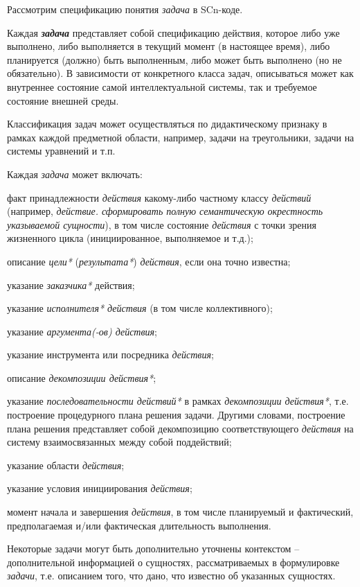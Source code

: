 Рассмотрим спецификацию понятия \textit{задача} в SCn-коде.

\begin{SCn}
\end{SCn}

Каждая \textbf{\textit{задача}} представляет собой спецификацию действия, которое либо уже выполнено, либо выполняется в текущий момент (в настоящее время), либо планируется (должно) быть выполненным, либо может быть выполнено (но не обязательно). В зависимости от конкретного класса задач, описываться может как внутреннее состояние самой интеллектуальной системы, так и требуемое состояние внешней среды.

Классификация задач может осуществляться по дидактическому признаку в рамках каждой предметной области, например, задачи на треугольники, задачи на системы уравнений и т.п.

Каждая \textit{задача} может включать:
\begin{textitemize}
	\item факт принадлежности \textit{действия} какому-либо частному классу \textit{действий} (например,\textit{ действие. сформировать полную семантическую окрестность указываемой сущности}), в том числе состояние \textit{действия} с точки зрения жизненного цикла (инициированное, выполняемое и т.д.);
	\item описание \textit{цели*} (\textit{результата*}) \textit{действия}, если она точно известна;
	\item указание \textit{заказчика*} действия;
	\item указание \textit{исполнителя* действия} (в том числе коллективного);
	\item указание \textit{аргумента(-ов) действия\scnrolesign};
	\item указание инструмента или посредника \textit{действия};
	\item описание \textit{декомпозиции действия*};
	\item указание \textit{последовательности действий*} в рамках \textit{декомпозиции действия*}, т.е. построение процедурного плана решения задачи. Другими словами, построение плана решения представляет собой декомпозицию соответствующего \textit{действия} на систему взаимосвязанных между собой поддействий;
	\item указание области \textit{действия};
	\item указание условия инициирования \textit{действия};
	\item момент начала и завершения \textit{действия}, в том числе планируемый и фактический, предполагаемая и/или фактическая длительность выполнения.
\end{textitemize}
Некоторые задачи могут быть дополнительно уточнены контекстом -- дополнительной информацией о сущностях, рассматриваемых в формулировке \textit{задачи}, т.е. описанием того, что дано, что известно об указанных сущностях.

